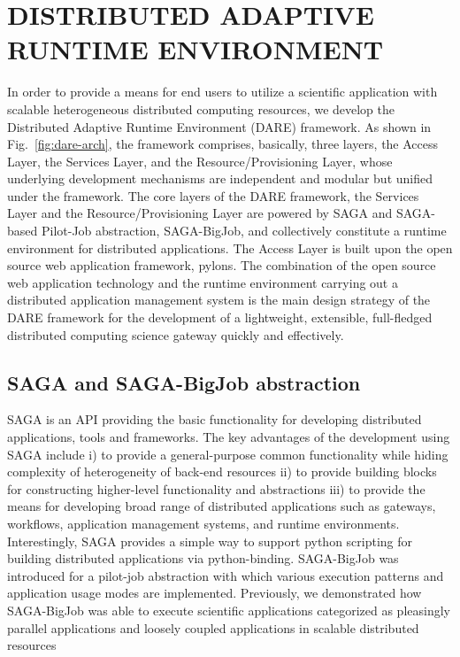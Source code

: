 \documentclass{sig-alternate}
\begin{document}
\section{DISTRIBUTED ADAPTIVE RUNTIME ENVIRONMENT}
In order to provide a means for end users to utilize a scientific application with scalable heterogeneous distributed computing resources, we develop the Distributed Adaptive Runtime Environment (DARE) framework\cite{dareurl}.  As shown in Fig.~\ref{fig:dare-arch}, the framework comprises, basically, three layers, the Access Layer, the Services Layer, and the Resource/Provisioning Layer, whose underlying development mechanisms are independent and modular but unified under the framework.  The core layers of the DARE framework, the Services Layer and the Resource/Provisioning Layer are powered by SAGA and SAGA-based Pilot-Job abstraction, SAGA-BigJob\cite{saga-ccgrid10,saga-royalsoc,saga-web,jha2009developing,ecmls10, ecmls11}, and collectively constitute a runtime environment for distributed applications.  The Access Layer is built upon the open source web application framework, pylons\cite{pylonsurl}.  The combination of the open source web application technology and the runtime environment carrying out a distributed application management system is the main design strategy of the DARE framework for the development of a lightweight, extensible, full-fledged distributed computing science gateway quickly and effectively\cite{pylonsurl}. 

\subsection{SAGA and SAGA-BigJob abstraction}
SAGA is an API providing the basic functionality for developing distributed applications, tools and frameworks\cite{saga-web}. The key advantages of the development using SAGA include i) to provide a general-purpose common functionality while hiding complexity of heterogeneity of back-end resources ii) to provide building blocks for constructing higher-level functionality and abstractions iii) to provide the means for developing broad range of distributed applications such as gateways, workflows, application management systems, and runtime environments.   Interestingly, SAGA provides a simple way to support python scripting for building distributed applications via python-binding.  SAGA-BigJob was introduced for a pilot-job abstraction with which various execution patterns and application usage modes are implemented.  Previously, we demonstrated how SAGA-BigJob was able to execute scientific applications categorized as pleasingly parallel applications and loosely coupled applications in scalable distributed resources\cite{saga-royalsoc,jha2009developing, ecmls10, ecmls11}
\end{document}
